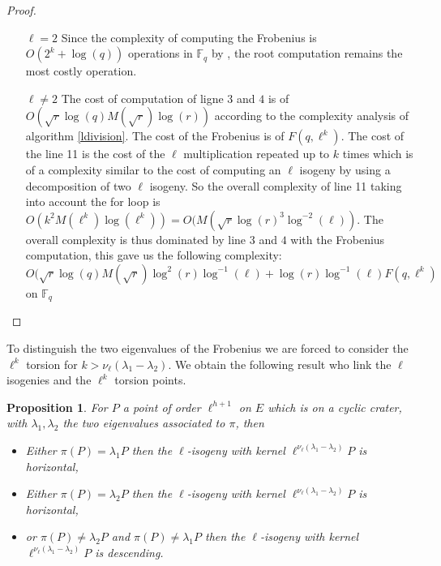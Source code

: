 \documentclass{article}
\theoremstyle{plain}
\newtheorem{prop}[thm]{Proposition}
\theoremstyle{definition}
\theoremstyle{remark}
\begin{document}
\begin{proof}
\begin{enumerate}
\item[$\ell=2$]
Since the complexity of computing the Frobenius is $O(2^k+\log(q))$ operations in $\mathbb{F}_q$ by \cite{DBLP:journals/dcc/DoliskaniS15}, the root computation remains the most costly operation.
\item[$\ell \neq 2$] The cost of computation of ligne $3$ and $4$ is of $O(\sqrt{r} \log(q) M(\sqrt{r})\log(r))$ according to the complexity analysis of algorithm \ref{ldivision}. The cost of the Frobenius is of $F(q,\ell^k)$. The cost of the line 11 is the cost of the $\ell$ multiplication repeated up to $k$ times which is of a complexity similar to the cost of computing an $\ell$ isogeny by using a decomposition of two $\ell$ isogeny. So the overall complexity of line 11 taking into account the for loop is $O(k^2M(\ell^k)\log(\ell^k))=O(M(\sqrt{r}\log(r)^3\log^{-2}(\ell))$. The overall complexity is thus dominated by line $3$ and $4$ with the Frobenius computation, this gave us the following complexity: $O(\sqrt{r} \log(q) M(\sqrt{r})\log^2(r)\log^{-1}(\ell)+ \log(r)\log^{-1}(\ell) F(q,\ell^k)$ on $\mathbb{F}_q$
\end{enumerate}
\end{proof}


To distinguish the two eigenvalues of the Frobenius we are forced to consider the $\ell^k$ torsion for $k>\nu_{\ell}(\lambda_1-\lambda_2)$. We obtain the following result who link the $\ell$ isogenies and the $\ell^k$ torsion points.

\begin{prop} \label{conjecture}
For $P$ a point of order $\ell^{h+1}$ on $E$ which is on a cyclic crater, with $\lambda_1, \lambda_2$ the two eigenvalues associated to $\pi$, then
\begin{itemize}
\item Either $\pi(P)=\lambda_1P$ then the $\ell$-isogeny with kernel $\ell^{\nu_{\ell}(\lambda_1-\lambda_2)} P$ is horizontal,
\item Either $\pi(P)=\lambda_2P$ then the $\ell$-isogeny with kernel $\ell^{\nu_{\ell}(\lambda_1-\lambda_2)} P$ is horizontal,
\item or $\pi(P) \neq \lambda_2P$ and $\pi(P) \neq \lambda_1P$ then the $\ell$-isogeny with kernel $\ell^{\nu_{\ell}(\lambda_1-\lambda_2)} P$ is descending.
\end{itemize} 
\end{prop}
\end{document}
